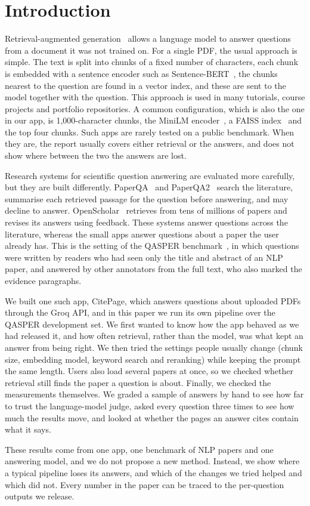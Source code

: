 \section{Introduction}
\label{sec:intro}

Retrieval-augmented generation~\cite{lewis2020rag} allows a language model to answer questions
from a document it was not trained on. For a single PDF, the usual approach is simple. The text is
split into chunks of a fixed number of characters, each chunk is embedded with a sentence encoder
such as Sentence-BERT~\cite{reimers2019sbert}, the chunks nearest to the question are found in a
vector index, and these are sent to the model together with the question. This approach is used
in many tutorials, course projects and portfolio repositories. A common configuration, which is
also the one in our app, is 1,000-character chunks, the MiniLM encoder~\cite{wang2020minilm}, a
FAISS index~\cite{johnson2021faiss} and the top four chunks. Such apps are rarely tested on a
public benchmark. When they are, the report usually covers either retrieval or the answers, and
does not show where between the two the answers are lost.

Research systems for scientific question answering are evaluated more carefully, but they are
built differently. PaperQA~\cite{lala2023paperqa} and PaperQA2~\cite{skarlinski2024paperqa2}
search the literature, summarise each retrieved passage for the question before answering, and
may decline to answer. OpenScholar~\cite{asai2024openscholar} retrieves from tens of millions of
papers and revises its answers using feedback. These systems answer questions across the
literature, whereas the small apps answer questions about a paper the user already has. This is
the setting of the QASPER benchmark~\cite{dasigi2021qasper}, in which questions were written by
readers who had seen only the title and abstract of an NLP paper, and answered by other
annotators from the full text, who also marked the evidence paragraphs.

We built one such app, CitePage, which answers questions about uploaded PDFs through the Groq
API, and in this paper we run its own pipeline over the QASPER development set. We first wanted
to know how the app behaved as we had released it, and how often retrieval, rather than the
model, was what kept an answer from being right. We then tried the settings people usually
change (chunk size, embedding model, keyword search and reranking) while keeping the prompt the
same length. Users also load several papers at once, so we checked whether retrieval still finds
the paper a question is about. Finally, we checked the measurements themselves. We graded a
sample of answers by hand to see how far to trust the language-model judge, asked every question
three times to see how much the results move, and looked at whether the pages an answer cites
contain what it says.

These results come from one app, one benchmark of NLP papers and one answering model, and we
do not propose a new method. Instead, we show where a typical pipeline loses its answers, and
which of the changes we tried helped and which did not. Every number in the paper can be traced
to the per-question outputs we release.

